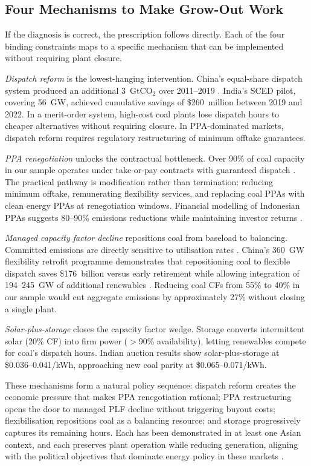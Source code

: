 \documentclass[review,3p,authoryear]{elsarticle}
\begin{document}
\subsection{Four Mechanisms to Make Grow-Out Work}

If the diagnosis is correct, the prescription follows directly. Each of the four binding constraints maps to a specific mechanism that can be implemented without requiring plant closure.

\textit{Dispatch reform} is the lowest-hanging intervention. China's equal-share dispatch system produced an additional 3~GtCO$_2$ over 2011--2019 \citep{Yu2023}. India's SCED pilot, covering 56~GW, achieved cumulative savings of \$260~million between 2019 and 2022. In a merit-order system, high-cost coal plants lose dispatch hours to cheaper alternatives without requiring closure. In PPA-dominated markets, dispatch reform requires regulatory restructuring of minimum offtake guarantees.

\textit{PPA renegotiation} unlocks the contractual bottleneck. Over 90\% of coal capacity in our sample operates under take-or-pay contracts with guaranteed dispatch \citep{Boute2025}. The practical pathway is modification rather than termination: reducing minimum offtake, remunerating flexibility services, and replacing coal PPAs with clean energy PPAs at renegotiation windows. Financial modelling of Indonesian PPAs suggests 80--90\% emissions reductions while maintaining investor returns \citep{Bodnar2020}.

\textit{Managed capacity factor decline} repositions coal from baseload to balancing. Committed emissions are directly sensitive to utilisation rates \citep{Tong2019}. China's 360~GW flexibility retrofit programme demonstrates that repositioning coal to flexible dispatch saves \$176~billion versus early retirement while allowing integration of 194--245~GW of additional renewables \citep{An2025}. Reducing coal CFs from 55\% to 40\% in our sample would cut aggregate emissions by approximately 27\% without closing a single plant.

\textit{Solar-plus-storage} closes the capacity factor wedge. Storage converts intermittent solar (20\% CF) into firm power ($>$90\% availability), letting renewables compete for coal's dispatch hours. Indian auction results show solar-plus-storage at \$0.036--0.041/kWh, approaching new coal parity at \$0.065--0.071/kWh.

These mechanisms form a natural policy sequence: dispatch reform creates the economic pressure that makes PPA renegotiation rational; PPA restructuring opens the door to managed PLF decline without triggering buyout costs; flexibilisation repositions coal as a balancing resource; and storage progressively captures its remaining hours. Each has been demonstrated in at least one Asian context, and each preserves plant operation while reducing generation, aligning with the political objectives that dominate energy policy in these markets \citep{Ohlendorf2022}.
\end{document}
